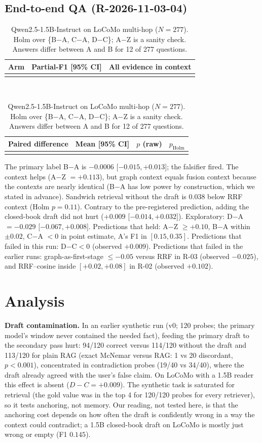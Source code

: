 \documentclass[10pt]{article}
\begin{document}
\subsection{End-to-end QA (R-2026-11-03-04)}
\begin{table}[h]
\centering\small
\begin{tabular}{lcc}\toprule
Arm & Partial-F1 [95\% CI] & All evidence in context\\\midrule
\\\bottomrule
\end{tabular}\\[4pt]
\begin{tabular}{lccc}\toprule
Paired difference & Mean [95\% CI] & $p$ (raw) & $p_{\mathrm{Holm}}$\\\midrule
\\\bottomrule
\end{tabular}
\caption{Qwen2.5-1.5B-Instruct on LoCoMo multi-hop ($N=277$). Holm over \{B$-$A, C$-$A, D$-$C\}; A$-$Z is a sanity check. Answers differ between A and B for 12 of 277 questions.}\label{tab:qa}
\end{table}
The primary label B$-$A is $-0.0006$ [$-0.015,+0.013$]; the falsifier fired. The context helps (A$-$Z $=+0.113$), but graph context equals fusion context because the contexts are nearly identical (B$-$A has low power by construction, which we stated in advance). Sandwich retrieval without the draft is $0.038$ below RRF context (Holm $p=0.11$). Contrary to the pre-registered prediction, adding the closed-book draft did not hurt ($+0.009$ [$-0.014,+0.032]$). Exploratory: D$-$A $=-0.029$ [$-0.067,+0.008]$. Predictions that held: A$-$Z $\ge+0.10$, B$-$A within $\pm0.02$, C$-$A $<0$ in point estimate, A's F1 in $[0.15,0.35]$. Predictions that failed in this run: D$-$C$<0$ (observed $+0.009$). Predictions that failed in the earlier runs: graph-as-first-stage $\le-0.05$ versus RRF in R-03 (observed $-0.025$), and RRF--cosine inside $[+0.02,+0.08]$ in R-02 (observed $+0.102$).

\section{Analysis}
\textbf{Draft contamination.} In an earlier synthetic run (v0; 120 probes; the primary model's window never contained the needed fact), feeding the primary draft to the secondary pass hurt: 94/120 correct versus 114/120 without the draft and 113/120 for plain RAG (exact McNemar versus RAG: 1 vs 20 discordant, $p<0.001$), concentrated in contradiction probes (19/40 vs 34/40), where the draft already agreed with the user's false claim. On LoCoMo with a 1.5B reader this effect is absent ($D-C=+0.009$). The synthetic task is saturated for retrieval (the gold value was in the top 4 for 120/120 probes for every retriever), so it tests anchoring, not memory. Our reading, not tested here, is that the anchoring cost depends on how often the draft is confidently wrong in a way the context could contradict; a 1.5B closed-book draft on LoCoMo is mostly just wrong or empty (F1 $0.145$).
\end{document}

